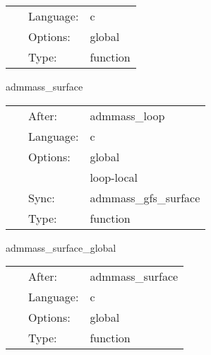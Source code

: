  \begin{tabular*}{160mm}{cll} 
~ & Language:  & c \\ 
~ & Options:  & global \\ 
~ & Type:  & function \\ 
\end{tabular*} 


\vspace{5mm}


\hspace{5mm} admmass\_surface 

\hspace{5mm}{\it calculate the admmass using a surface integral: local routine } 


\hspace{5mm}

 \begin{tabular*}{160mm}{cll} 
~ & After:  & admmass\_loop \\ 
~ & Language:  & c \\ 
~ & Options:  & global \\ 
~& ~ &loop-local\\ 
~ & Sync:  & admmass\_gfs\_surface \\ 
~ & Type:  & function \\ 
\end{tabular*} 


\vspace{5mm}


\hspace{5mm} admmass\_surface\_global 

\hspace{5mm}{\it calculate the admmass using a surface integral: global routine } 


\hspace{5mm}

 \begin{tabular*}{160mm}{cll} 
~ & After:  & admmass\_surface \\ 
~ & Language:  & c \\ 
~ & Options:  & global \\ 
~ & Type:  & function \\ 
\end{tabular*} 


\vspace{5mm}


